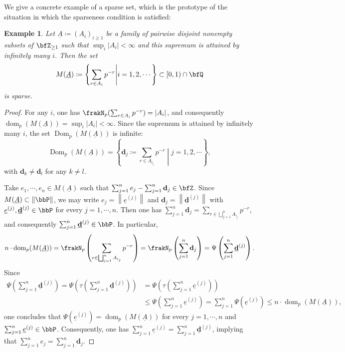 \documentclass[english,oneside]{smfart}
\newcommand{\opn}[1]{\operatorname{#1}}
\newcommand{\norm}[1]{\left\lVert#1\right\rVert}
\newtheorem{example}[theorem]{Example}
\begin{document}
We give a concrete example of a sparse set, which is the prototype of the situation in which the sparseness condition is satisfied:
\begin{example}\label{eg:new}
    Let $\underline{A}\coloneqq(A_i)_{i\geq 1}$ be a family of pairwise disjoint nonempty subsets of $\bfZ_{\geq 1}$ such that $\sup_i |A_i|<\infty$ and this supremum is attained by infinitely many $i$. Then the set
    $$M(\underline{A})\coloneqq\left\{\sum_{r\in A_i}p^{-r}\middle\vert i=1,2,\cdots\right\}\subset [0,1)\cap\bfQ$$
    is sparse.
\end{example}
\begin{proof}
    For any $i$, one has $\frakN_p(\sum_{r\in A_i}p^{-r})=|A_i|$, and consequently $\opn{dom}_p(M(\underline{A}))=\sup_i |A_i|<\infty$.  Since the supremum is attained by infinitely many $i$, the set $\opn{Dom}_p(M(\underline{A}))$ is infinite:
    $$\opn{Dom}_p(M(\underline{A}))=\left\{\mathbf{d}_j\coloneqq \sum_{r\in A_{i_j}}p^{-r}\middle\vert j=1,2,\cdots\right\},$$
    with $\mathbf{d}_k\neq \mathbf{d}_l$ for any $k\neq l$.%

    Take $e_1,\cdots,e_n\in M(\underline{A})$ such that $\sum_{j=1}^n e_j-\sum_{j=1}^n \mathbf{d}_j\in\bfZ$. Since $M(\underline{A})\subset \norm{\bbP}$, we may write $e_j=\norm{\underline{e}^{(j)}}$ and $\mathbf{d}_j=\norm{\underline{\mathbf{d}}^{(j)}}$ with $\underline{e}^{(j)}, \underline{\mathbf{d}}^{(j)}\in \bbP$ for every $j=1,\cdots,n$.  Then one has $\sum_{j=1}^n \mathbf{d}_j=\sum_{r\in\bigsqcup_{j=1}^n A_{i_j}}p^{-r}$, and consequently $\sum_{j=1}^n \underline{\mathbf{d}}^{(j)}\in\bbP$.
    In particular,
    \begin{equation*}
        n\cdot\opn{dom}_p(M(\underline{A}))=\frakN_p\left(\sum_{r\in\bigsqcup_{j=1}^n A_{i_j}}p^{-r}\right)=\frakN_p\left(\sum_{j=1}^n \mathbf{d}_j\right)=\Psi\left(\sum_{j=1}^n \underline{\mathbf{d}}^{(j)}\right).
    \end{equation*}
    Since
    \begin{align*}
        \Psi\left(\sum_{j=1}^n \underline{\mathbf{d}}^{(j)}\right)=\Psi\left(\tau\left(\sum_{j=1}^n \underline{\mathbf{d}}^{(j)}\right)\right) & =\Psi\left(\tau\left(\sum_{j=1}^n \underline{e}^{(j)}\right)\right)                                                                                 \\
                                                                                                                                                   & \leq \Psi\left(\sum_{j=1}^n \underline{e}^{(j)}\right)=\sum_{j=1}^n \Psi\left(\underline{e}^{(j)}\right)\leq n\cdot\opn{dom}_p(M(\underline{A})),
    \end{align*}
    one concludes that
    $\Psi\left(\underline{e}^{(j)}\right)=\opn{dom}_p(M(\underline{A}))$ for every $j=1,\cdots,n$ and $\sum_{j=1}^n \underline{e}^{(j)}\in\bbP$. Consequently, one has $\sum_{j=1}^n \underline{e}^{(j)}=\sum_{j=1}^n \underline{\mathbf{d}}^{(j)}$, implying that $\sum_{j=1}^n e_j=\sum_{j=1}^n \mathbf{d}_j$.


\end{proof}
\end{document}
